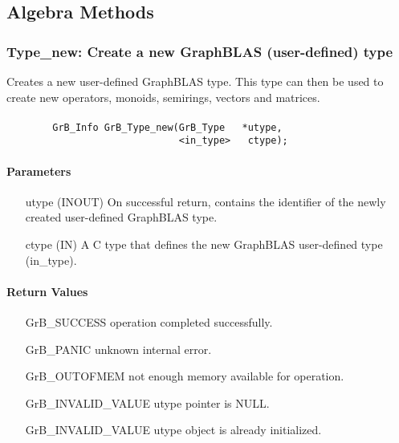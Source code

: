 \subsection{Algebra Methods}
\label{Sec:AlgebraMethods}



\subsubsection{{\sf Type\_new}: Create a new GraphBLAS (user-defined) type}

Creates a new user-defined GraphBLAS type. This type can then be used to create new
operators, monoids, semirings, vectors and matrices.

\paragraph{\syntax}

\begin{verbatim}
        GrB_Info GrB_Type_new(GrB_Type	 *utype,
                              <in_type>	  ctype);
\end{verbatim}

\paragraph{Parameters}

\begin{itemize}[leftmargin=1.1in]
    \item[{\sf utype}] ({\sf INOUT}) On successful return, contains the identifier 
                                     of the newly created user-defined GraphBLAS type.
	\item[{\sf ctype}] ({\sf IN})    A C type that defines the new GraphBLAS 
                                     user-defined type ({\sf in\_type}).
\end{itemize}

\paragraph{Return Values}

\begin{itemize}[leftmargin=2.1in]
\item[{\sf GrB\_SUCCESS}]           operation completed successfully.
\item[{\sf GrB\_PANIC}]             unknown internal error.
\item[{\sf GrB\_OUTOFMEM}]          not enough memory available for operation.
\item[{\sf GrB\_INVALID\_VALUE}]    {\sf utype} pointer is {\sf NULL}.
\item[{\sf GrB\_INVALID\_VALUE}]    {\sf utype} object is already initialized.
\end{itemize}

